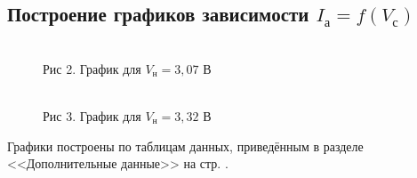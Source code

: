 \documentclass[12pt]{article}
\begin{document}
    \subsection{Построение графиков зависимости $I_а = f(V_с)$}

      \begin{figure}[h!]
        \begin{minipage}[h]{0.49\linewidth}
            \\
            Рис 2. График для $V_н = 3,07$ В
        \end{minipage}
        \begin{minipage}[h]{0.49\linewidth}
            \\
            Рис 3. График для $V_н = 3,32$ В
        \end{minipage}
        \label{fig:static_plots}
      \end{figure}

      Графики построены по таблицам данных, приведённым в разделе <<Дополнительные данные>> на стр. \pageref{table:static_method}.
\end{document}
